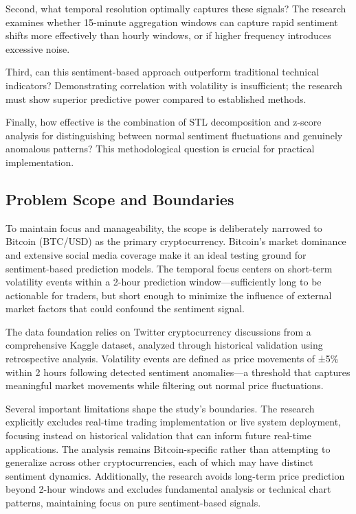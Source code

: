 \documentclass[11pt,twocolumn]{article}
\begin{document}
Second, what temporal resolution optimally captures these signals? The research examines whether 15-minute aggregation windows can capture rapid sentiment shifts more effectively than hourly windows, or if higher frequency introduces excessive noise.

Third, can this sentiment-based approach outperform traditional technical indicators? Demonstrating correlation with volatility is insufficient; the research must show superior predictive power compared to established methods.

Finally, how effective is the combination of STL decomposition and z-score analysis for distinguishing between normal sentiment fluctuations and genuinely anomalous patterns? This methodological question is crucial for practical implementation.

\subsection{\textbf{Problem Scope and Boundaries}}
To maintain focus and manageability, the scope is deliberately narrowed to Bitcoin (BTC/USD) as the primary cryptocurrency. Bitcoin's market dominance and extensive social media coverage make it an ideal testing ground for sentiment-based prediction models. The temporal focus centers on short-term volatility events within a 2-hour prediction window—sufficiently long to be actionable for traders, but short enough to minimize the influence of external market factors that could confound the sentiment signal.

The data foundation relies on Twitter cryptocurrency discussions from a comprehensive Kaggle dataset, analyzed through historical validation using retrospective analysis. Volatility events are defined as price movements of ±5\% within 2 hours following detected sentiment anomalies—a threshold that captures meaningful market movements while filtering out normal price fluctuations.

Several important limitations shape the study's boundaries. The research explicitly excludes real-time trading implementation or live system deployment, focusing instead on historical validation that can inform future real-time applications. The analysis remains Bitcoin-specific rather than attempting to generalize across other cryptocurrencies, each of which may have distinct sentiment dynamics. Additionally, the research avoids long-term price prediction beyond 2-hour windows and excludes fundamental analysis or technical chart patterns, maintaining focus on pure sentiment-based signals.
\end{document}
